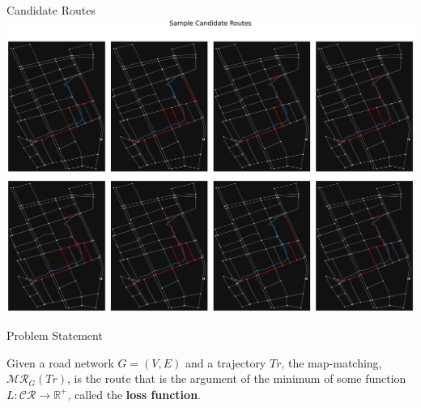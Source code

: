 \documentclass[aspectratio=169, bigfiles, professionalfonts, hyperref={colorlinks=true, allcolors=., urlcolor=blue}]{beamer}
\newcommand{\CR}{\mathcal{CR}}
\begin{document}

\begin{frame}{Candidate Routes}
        \centering
        \includegraphics[width=\textwidth,height=0.8\textheight,keepaspectratio]{candidateroutes.png}
\end{frame}



\begin{frame}{Problem Statement}

\begin{definition}
Given a road network $G=(V, E)$ and a trajectory
$Tr$, {\color{blue} the map-matching, $\mathcal{MR}_G(Tr)$}, is the route that is the argument of the minimum of some function $L:\CR\rightarrow \mathbb{R}^+$, called the \textbf{loss function}. 
\end{definition}

\end{frame}
\end{document}
